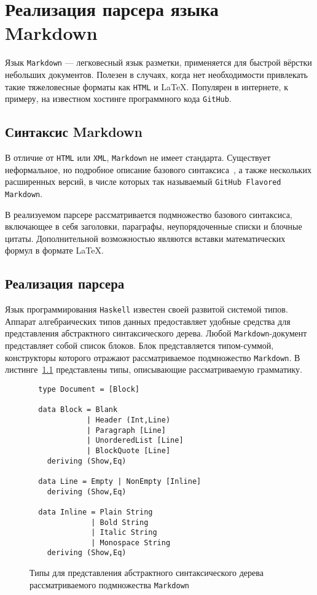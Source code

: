 
\chapter{Реализация парсера языка Markdown}

Язык \lstinline{Markdown} --- легковесный язык разметки, применяется для быстрой
вёрстки небольших документов. Полезен в случаях, когда нет необходимости привлекать
такие тяжеловесные форматы как \lstinline{HTML} и \LaTeX. Популярен в
интернете, к примеру, на известном хостинге программного кода
\lstinline{GitHub}.

\section{Синтаксис Markdown}

  В отличие от \lstinline{HTML} или \lstinline{XML}, \lstinline{Markdown} не имеет
  стандарта. Существует неформальное, но подробное описание базового
  синтаксиса~\cite{markdownSyntax}, а также нескольких расширенных версий, в
  числе которых так называемый \lstinline{GitHub Flavored Markdown}.

  В реализуемом парсере рассматривается подмножество базового синтаксиса,
  включающее в себя заголовки, параграфы, неупорядоченные списки и блочные цитаты.
  Дополнительной возможностью являются вставки математических формул в формате
  \LaTeX.

\section{Реализация парсера}

  Язык программирования \lstinline{Haskell} известен своей развитой системой
  типов. Аппарат алгебраических типов данных предоставляет удобные средства для
  представления абстрактного синтаксического дерева. Любой
  \lstinline{Markdown}-документ представляет собой список блоков. Блок
  представляется типом-суммой, конструкторы которого отражают рассматриваемое
  подмножество \lstinline{Markdown}. В листинге~\ref{listing:MarkdownADT}
  представлены типы, описывающие рассматриваемую грамматику.

  \begin{figure}[t]
  \begin{lstlisting}
  type Document = [Block]

  data Block = Blank
             | Header (Int,Line)
             | Paragraph [Line]
             | UnorderedList [Line]
             | BlockQuote [Line]
    deriving (Show,Eq)

  data Line = Empty | NonEmpty [Inline]
    deriving (Show,Eq)

  data Inline = Plain String
              | Bold String
              | Italic String
              | Monospace String
    deriving (Show,Eq)
  \end{lstlisting}
  \caption{Типы для представления абстрактного синтаксического дерева
  рассматриваемого подмножества \lstinline{Markdown}}
  \label{listing:MarkdownADT}
  \end{figure}

